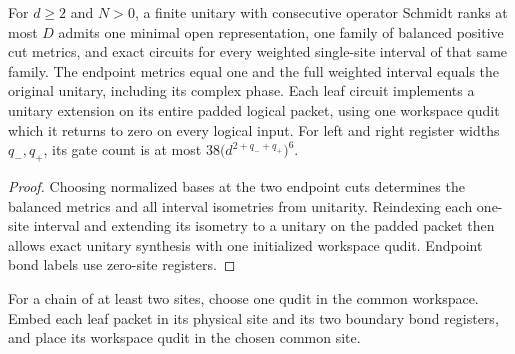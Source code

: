 \begin{lemma}
    \label{thm:mpu_minimal_leaf_circuits}
    \leanok
    For $d\geq2$ and $N>0$, a finite unitary with consecutive operator
    Schmidt ranks at most $D$ admits one minimal open representation,
    one family of balanced positive cut metrics, and exact circuits
    for every weighted single-site interval of that same family.
    The endpoint metrics equal one and the full weighted interval
    equals the original unitary, including its complex phase.
    Each leaf circuit implements a unitary extension on its entire
    padded logical packet, using one workspace qudit which it returns
    to zero on every logical input. For left and right register widths
    $q_-,q_+$, its gate count is at most
    $38\bigl(d^{2+q_-+q_+}\bigr)^6$.
\end{lemma}
\begin{proof}\leanok
    Choosing normalized bases at the two endpoint cuts determines the
    balanced metrics and all interval isometries from unitarity.
    Reindexing each one-site interval and extending its isometry to a
    unitary on the padded packet then allows exact unitary synthesis
    with one initialized workspace qudit. Endpoint bond labels use
    zero-site registers.
\end{proof}

\begin{definition}
    \label{def:mpu_minimal_leaf_placement}
    \leanok
    For a chain of at least two sites, choose one qudit in the common
    workspace. Embed each leaf packet in its physical site and its
    two boundary bond registers, and place its workspace qudit in
    the chosen common site.
\end{definition}

